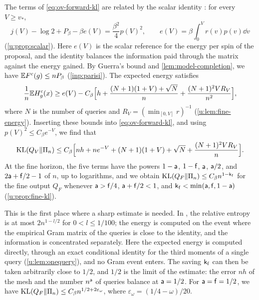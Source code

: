 The terms of \eqref{eq:ov-forward-kl} are related by the scalar identity
\cite[Lemma~4]{oai-typical-upper}: for every $V\ge v_*$,
\begin{equation}\label{eq:ov-scalar-identity}
 j(V)-\log2+P_\beta-\beta e(V)=\frac{\beta^2}4p(V)^2,
 \qquad e(V)=\beta\int_0^Vr(v)p(v)\dd v
\end{equation}
(\cref{u:prop:scalar}). Here $e(V)$ is the scalar reference for the energy per spin of the proposal,
and the identity balances the information paid through the matrix against the
energy gained. By Guerra's bound and \cref{lem:model-completion}, we have
$\mathbb E F^c(g)\le nP_\beta$ (\cref{inp:parisi}). The expected energy satisfies
\[
 \frac1n\mathbb E H^c_g(x)\ge e(V)-C_\beta\Bigl[h+\frac{(N+1)(1+V)+\sqrt N}n
 +\frac{(N+1)^2VR_V}{n^2}\Bigr],
\]
where $N$ is the number of queries and $R_V=(\min_{[0,V]}r)^{-1}$
(\cref{u:lem:fine-energy}). Inserting these bounds into
\eqref{eq:ov-forward-kl}, and using $p(V)^2\le C_\beta e^{-V}$, we find that
\[
 \operatorname{KL}(Q_V\Vert\Pi_n)\le C_\beta\Bigl[nh+ne^{-V}+(N+1)(1+V)+\sqrt N
 +\frac{(N+1)^2VR_V}n\Bigr].
\]
At the fine horizon, the five terms have the powers $1-\mathsf{a}$, $1-\mathsf{f}$,
$\mathsf{a}$, $\mathsf{a}/2$, and $2\mathsf{a}+\mathsf{f}/2-1$ of $n$, up to logarithms, and we
obtain $\operatorname{KL}(Q_F\Vert\Pi_n)\le C_\beta n^{1-\mathsf{k}_{\rm f}}$ for the fine
output $Q_F$ whenever $\mathsf{a}>\mathsf{f}/4$, $\mathsf{a}+\mathsf{f}/2<1$, and
$\mathsf{k}_{\rm f}<\min(\mathsf{a},\mathsf{f},1-\mathsf{a})$ (\cref{u:prop:fine-kl}).

This is the first place where a sharp estimate is needed. In
\cite[Proposition~5]{oai-typical-upper}, the relative entropy is at most
$2n^{1-l/2}$ for $0<l\le1/100$; the energy is computed on the event where the
empirical Gram matrix of the queries is close to the identity, and the
information is concentrated separately. Here the expected energy is computed
directly, through an exact conditional identity for the third moments of a
single query (\cref{u:lem:onequery}), and no Gram event enters. The saving
$\mathsf{k}_{\rm f}$ can then be taken arbitrarily close to $1/2$, and $1/2$ is the
limit of the estimate: the error $nh$ of the mesh and the number $n^{\mathsf{a}}$
of queries balance at $\mathsf{a}=1/2$. For $\mathsf{a}=\mathsf{f}=1/2$, we have
$\operatorname{KL}(Q_F\Vert\Pi_n)\le C_\beta n^{1/2+2\varepsilon_\omega}$, where
$\varepsilon_\omega=(1/4-\omega)/20$.

